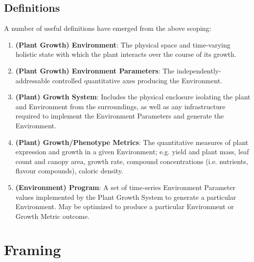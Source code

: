 \documentclass{../tex/report}
\begin{document}

\clearpage
\subsection{Definitions}
\label{sec:definitions}

A number of useful definitions have emerged from the above scoping:
\begin{enumerate}
    \item \textbf{(Plant Growth) Environment}: The physical space and time-varying holistic state with which the plant interacts over the course of its growth.
    \item \textbf{(Plant Growth) Environment Parameters}: The independently-addressable controlled quantitative axes producing the Environment.
    \item \textbf{(Plant) Growth System}: Includes the physical enclosure isolating the plant and Environment from the surroundings, as well as any infrastructure required to implement the Environment Parameters and generate the Environment.
    \item \textbf{(Plant) Growth/Phenotype Metrics}: The quantitative measures of plant expression and growth in a given Environment; e.g. yield and plant mass, leaf count and canopy area, growth rate, compound concentrations (i.e. nutrients, flavour compounds), caloric density.
    \item \textbf{(Environment) Program}: A set of time-series Environment Parameter values implemented by the Plant Growth System to generate a particular Environment. May be optimized to produce a particular Environment or Growth Metric outcome.
\end{enumerate}

\clearpage
\section{Framing}
\label{sec:framing}
\end{document}
